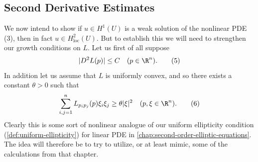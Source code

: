 \subsection{Second Derivative Estimates}
\label{sec:second-derivative-estimates-calculus-of-variations}

We now intend to show if $u \in H^1(U)$ is a weak solution of the nonlinear PDE (3), then in fact $u \in H^2_{\text{loc}}(U)$. But to establish this we will need to strengthen our growth conditions on $L$. Let us first of all suppose
\[
|D^2L(p)| \le C \quad (p \in \R^n).
\tag{5}
\]
In addition let us assume that $L$ is uniformly convex, and so there exists a constant $\theta > 0$ such that
\[
\sum_{i,j=1}^n L_{p_ip_j}(p)\xi_i\xi_j \ge \theta|\xi|^2 \quad (p,\xi \in \R^n).
\tag{6}
\]
Clearly this is some sort of nonlinear analogue of our uniform ellipticity condition (\cref{def:uniform-ellipticity}) for linear PDE in \cref{chap:second-order-elliptic-equations}. The idea will therefore be to try to utilize, or at least mimic, some of the calculations from that chapter.

